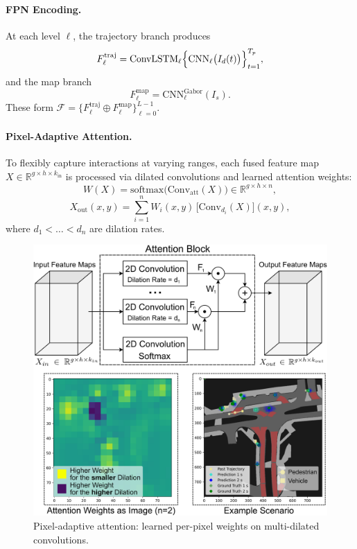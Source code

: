 \paragraph{FPN Encoding.} At each level $\ell$, the trajectory branch produces
\[
F_{\ell}^{\mathrm{traj}}
= \mathrm{ConvLSTM}_\ell\Bigl\{\mathrm{CNN}_\ell\bigl(I_d(t)\bigr)\Bigr\}_{t=1}^{T_p},
\]
and the map branch
\[
F_{\ell}^{\mathrm{map}}
= \mathrm{CNN}_\ell^{\mathrm{Gabor}}(I_s).
\]
These form $\mathcal F=\{F_\ell^{\mathrm{traj}}\oplus F_\ell^{\mathrm{map}}\}_{\ell=0}^{L-1}$.

\paragraph{Pixel-Adaptive Attention.} To flexibly capture interactions at varying ranges, each fused feature map $X\in\mathbb R^{g\times h\times k_{\mathrm{in}}}$ is processed via dilated convolutions and learned attention weights:
\[
W(X)=\mathrm{softmax}\bigl(\mathrm{Conv}_{\mathrm{att}}(X)\bigr)\in\mathbb R^{g\times h\times n},
\]
\[
X_{\mathrm{out}}(x,y) = \sum_{i=1}^n W_i(x,y)\,\bigl[\mathrm{Conv}_{d_i}(X)\bigr](x,y),
\]
where $d_1<\dots<d_n$ are dilation rates.
\begin{figure}[ht]
  \centering
  \includegraphics[width=\linewidth]{figures/caspnet_attn_block.png}
  \caption{Pixel-adaptive attention: learned per-pixel weights on multi-dilated convolutions.}
  \label{fig:attention_block}
\end{figure}

